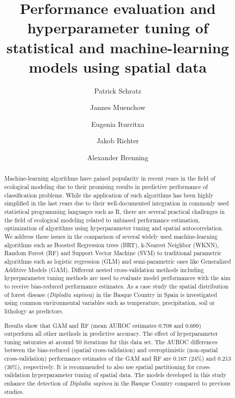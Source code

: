 \documentclass[review]{elsarticle}
\begin{document}
\begin{frontmatter}

	\title{Performance evaluation and hyperparameter tuning of statistical and machine-learning models using spatial data}

	\author[FSU]{Patrick Schratz}

	\author[FSU]{Jannes Muenchow}
	\author[NEIKER]{Eugenia Iturritxa}
	\author[TUDO]{Jakob Richter}
	\author[FSU]{Alexander Brenning}

	\address[FSU]{Department of Geography, GIScience group, Grietgasse 6, 07743, Jena, Germany}
	\address[NEIKER]{NEIKER, Granja Modelo –Arkaute, Apdo. 46, 01080 Vitoria-Gasteiz, Arab, Spain}
	\address[TUDO]{Department of Statistics, TU Dortmund University, Germany}

	\begin{abstract}
		Machine-learning algorithms have gained popularity in recent years in the field of ecological modeling due to their promising results in predictive performance of classification problems.
		While the application of such algorithms has been highly simplified in the last years due to their well-documented integration in commonly used statistical programming languages such as R, there are several practical challenges in the field of ecological modeling related to unbiased performance estimation, optimization of algorithms using hyperparameter tuning and spatial autocorrelation.
		We address these issues in the comparison of several widely used machine-learning algorithms such as Boosted Regression trees (BRT), k-Nearest Neighbor (WKNN), Random Forest (RF) and Support Vector Machine (SVM) to traditional parametric algorithms such as logistic regression (GLM) and semi-parametric ones like Generalized Additive Models (GAM).
		Different nested cross-validation methods including hyperparameter tuning methods are used to evaluate model performances with the aim to receive bias-reduced performance estimates.
		As a case study the spatial distribution of forest disease (\textit{Diplodia sapinea}) in the Basque Country in Spain is investigated using common environmental variables such as temperature, precipitation, soil or lithology as predictors.

		Results show that GAM and \ac{RF} (mean AUROC estimates 0.708 and 0.699) outperform all other methods in predictive accuracy.
		The effect of hyperparameter tuning saturates at around 50 iterations for this data set.
		The AUROC differences between the bias-reduced (spatial cross-validation) and overoptimistic (non-spatial cross-validation) performance estimates of the GAM and RF are 0.167 (24\%) and 0.213 (30\%), respectively.
		It is recommended to also use spatial partitioning for cross-validation hyperparameter tuning of spatial data.
		The models developed in this study enhance the detection of \textit{Diplodia sapinea} in the Basque Country compared to previous studies.
	\end{abstract}


\end{frontmatter}
\end{document}
